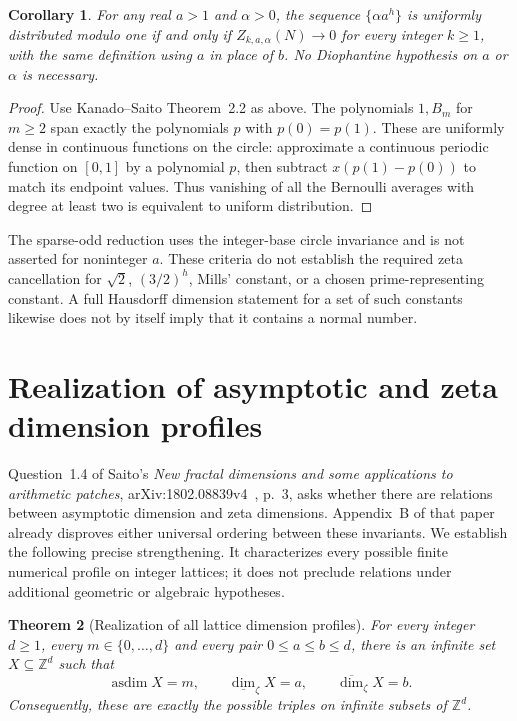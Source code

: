 \documentclass[11pt,a4paper]{article}
\newtheorem{theorem}{Theorem}[section]
\newtheorem{corollary}[theorem]{Corollary}
\theoremstyle{definition}
\theoremstyle{remark}
\numberwithin{equation}{section}
\begin{document}
\begin{corollary}\label{sur:cor:general-exponential-normality}
For any real $a>1$ and $\alpha>0$, the sequence $\{\alpha a^h\}$ is uniformly
distributed modulo one if and only if
$Z_{k,a,\alpha}(N)\to0$ for every integer $k\geq1$, with the same definition
using $a$ in place of $b$.  No Diophantine hypothesis on $a$ or $\alpha$
is necessary.
\end{corollary}

\begin{proof}
Use Kanado--Saito Theorem~2.2 as above.  The polynomials $1,B_m$ for $m\geq2$
span exactly the polynomials $p$ with $p(0)=p(1)$.  These are uniformly dense
in continuous functions on the circle: approximate a continuous periodic
function on $[0,1]$ by a polynomial $p$, then subtract
$x(p(1)-p(0))$ to match its endpoint values.  Thus vanishing of all the
Bernoulli averages with degree at least two is equivalent to uniform
distribution.
\end{proof}

The sparse-odd reduction uses the integer-base circle invariance and is
not asserted for noninteger $a$.  These criteria do not establish the
required zeta cancellation for $\sqrt2$, $(3/2)^h$, Mills' constant, or a
chosen prime-representing constant.  A full Hausdorff dimension statement
for a set of such constants likewise does not by itself imply that it
contains a normal number.


\section{Realization of asymptotic and zeta dimension profiles}
\label{sur:sec:fractal-profiles}

Question~1.4 of Saito's \emph{New fractal dimensions and some applications to arithmetic patches}, arXiv:1802.08839v4~\cite{SaitoFractalProfiles}, p.~3, asks whether there are relations between asymptotic dimension and zeta dimensions. Appendix~B of that paper already disproves either universal ordering between these invariants. We establish the following precise strengthening. It characterizes every possible finite numerical profile on integer lattices; it does not preclude relations under additional geometric or algebraic hypotheses.

\begin{theorem}[Realization of all lattice dimension profiles]
For every integer $d\geq1$, every $m\in\{0,\ldots,d\}$ and every pair $0\leq a\leq b\leq d$, there is an infinite set $X\subseteq\mathbb Z^d$ such that
\[
 \operatorname{asdim}X=m,\qquad
 \underline{\dim}_{\zeta}X=a,\qquad
 \overline{\dim}_{\zeta}X=b.
\]
Consequently, these are exactly the possible triples on infinite subsets of $\mathbb Z^d$.
\end{theorem}
\end{document}
